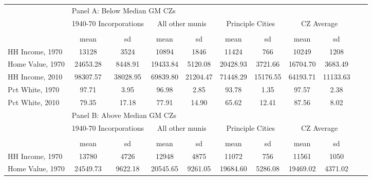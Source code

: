 \begin{tabular}{l*{10}{c}} \toprule
&\multicolumn{8}{l}{Panel A: Below Median GM CZs}\\
\cmidrule(lr){1-9}
&\multicolumn{2}{c}{1940-70 Incorporations}&\multicolumn{2}{c}{All other munis}&\multicolumn{2}{c}{Principle Cities}&\multicolumn{2}{c}{CZ Average}\\ \cmidrule(lr){2-3}  \cmidrule(lr){4-5} \cmidrule(lr){6-7} \cmidrule(lr){8-9}
                    &\multicolumn{2}{c}{}     &\multicolumn{2}{c}{}     &\multicolumn{2}{c}{}     &\multicolumn{2}{c}{}     \\
                    &        mean&          sd&        mean&          sd&        mean&          sd&        mean&          sd\\
\midrule
HH Income, 1970     &       13128&        3524&       10894&        1846&       11424&         766&       10249&        1208\\
Home Value, 1970    &    24653.28&     8448.91&    19433.84&     5120.08&    20428.93&     3721.66&    16704.70&     3683.49\\
HH Income, 2010     &    98307.57&    38028.95&    69839.80&    21204.47&    71448.29&    15176.55&    64193.71&    11133.63\\
Pct White, 1970     &       97.71&        3.95&       96.98&        2.85&       93.78&        1.35&       97.57&        2.38\\
Pct White, 2010     &       79.35&       17.18&       77.91&       14.90&       65.62&       12.41&       87.56&        8.02\\
 \toprule
&\multicolumn{8}{l}{Panel B: Above Median GM CZs}\\
\cmidrule(lr){1-9}
&\multicolumn{2}{c}{1940-70 Incorporations}&\multicolumn{2}{c}{All other munis}&\multicolumn{2}{c}{Principle Cities}&\multicolumn{2}{c}{CZ Average}\\ \cmidrule(lr){2-3}  \cmidrule(lr){4-5} \cmidrule(lr){6-7} \cmidrule(lr){8-9}
                    &\multicolumn{2}{c}{}     &\multicolumn{2}{c}{}     &\multicolumn{2}{c}{}     &\multicolumn{2}{c}{}     \\
                    &        mean&          sd&        mean&          sd&        mean&          sd&        mean&          sd\\
\midrule
HH Income, 1970     &       13780&        4726&       12948&        4875&       11072&         756&       11561&        1050\\
Home Value, 1970    &    24549.73&     9622.18&    20545.65&     9261.05&    19684.60&     5286.08&    19469.02&     4371.02\\

\end{tabular}
